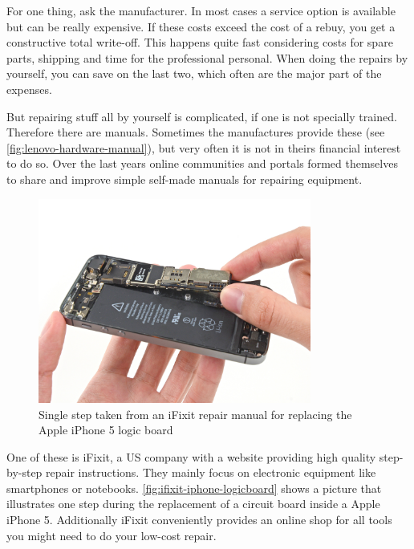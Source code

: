	
	For one thing, ask the manufacturer. In most cases a service option is available but can be really expensive. If these costs exceed the cost of a rebuy, you get a constructive total write-off. This happens quite fast considering costs for spare parts, shipping and time for the professional personal. When doing the repairs by yourself, you can save on the last two, which often are the major part of the expenses.
	
	But repairing stuff all by yourself is complicated, if one is not specially trained. Therefore there are manuals. Sometimes the manufactures provide these (see \autoref{fig:lenovo-hardware-manual}), but very often it is not in theirs financial interest to do so. Over the last years online communities and portals formed themselves to share and improve simple self-made manuals for repairing equipment.
	
	\begin{figure}[H]
		\includegraphics[width=0.8\textwidth]{../images/ifixit-iphone-logicboard.jpg}
		\centering
		\caption[Single step taken from an iFixit repair manual for replacing the Apple iPhone 5 logic board]{Single step taken from an iFixit repair manual for replacing the Apple iPhone 5 logic board\footnotemark}
		\label{fig:ifixit-iphone-logicboard}
	\end{figure}
	
	One of these is iFixit, a US company with a website providing high quality step-by-step repair instructions. They mainly focus on electronic equipment like smartphones or notebooks. \autoref{fig:ifixit-iphone-logicboard} shows a picture that illustrates one step during the replacement of a circuit board inside a Apple iPhone 5. Additionally iFixit conveniently provides an online shop for all tools you might need to do your low-cost repair.
	

